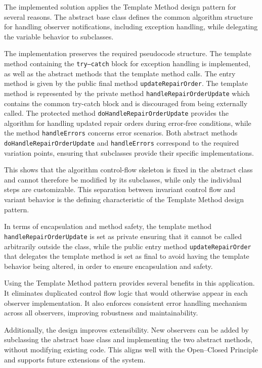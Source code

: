 \documentclass[a4paper]{scrartcl}
\begin{document}
The implemented solution applies the Template Method design pattern for several reasons. The abstract base class defines the common algorithm structure for handling observer notifications, including exception handling, while delegating the variable behavior to subclasses.

The implementation preserves the required pseudocode structure. The template method containing the \texttt{try--catch} block for exception handling is implemented, as well as the abstract methods that the template method calls. The entry method is given by the public final method \texttt{updateRepairOrder}. The template method is represented by the private method \texttt{handleRepairOrderUpdate} which contains the common try-catch block and is discouraged from being externally called. The protected method \texttt{doHandleRepairOrderUpdate} provides the algorithm for handling updated repair orders during error-free conditions, while the method \texttt{handleErrors} concerns error scenarios. Both abstract methods \texttt{doHandleRepairOrderUpdate} and \texttt{handleErrors} correspond to the required variation points, ensuring that subclasses provide their specific implementations.

This shows that the algorithm control-flow skeleton is fixed in the abstract class and cannot therefore be modified by its subclasses, while only the individual steps are customizable. This separation between invariant control flow and variant behavior is the defining characteristic of the Template Method design pattern.

In terms of encapsulation and method safety, the template method \texttt{handleRepairOrderUpdate} is set as private ensuring that it cannot be called arbitrarily outside the class, while the public entry method \texttt{updateRepairOrder} that delegates the template method is set as final to avoid having the template behavior being altered, in order to ensure encapsulation and safety.

Using the Template Method pattern provides several benefits in this application. It eliminates duplicated control flow logic that would otherwise appear in each observer implementation. It also enforces consistent error handling mechanism across all observers, improving robustness and maintainability.

Additionally, the design improves extensibility. New observers can be added by subclassing the abstract base class and implementing the two abstract methods, without modifying existing code. This aligns well with the Open--Closed Principle and supports future extensions of the system.
\end{document}
